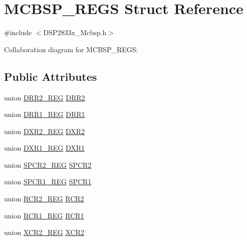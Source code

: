 \hypertarget{struct_m_c_b_s_p___r_e_g_s}{}\section{M\+C\+B\+S\+P\+\_\+\+R\+E\+G\+S Struct Reference}
\label{struct_m_c_b_s_p___r_e_g_s}


{\ttfamily \#include $<$D\+S\+P2833x\+\_\+\+Mcbsp.\+h$>$}



Collaboration diagram for M\+C\+B\+S\+P\+\_\+\+R\+E\+G\+S\+:
\subsection*{Public Attributes}
\begin{DoxyCompactItemize}
\item 
union \hyperlink{union_d_r_r2___r_e_g}{D\+R\+R2\+\_\+\+R\+E\+G} \hyperlink{struct_m_c_b_s_p___r_e_g_s_afce955ad6978e7a13dad4b00baa2021b}{D\+R\+R2}
\item 
union \hyperlink{union_d_r_r1___r_e_g}{D\+R\+R1\+\_\+\+R\+E\+G} \hyperlink{struct_m_c_b_s_p___r_e_g_s_a8525c0c84cbbbc4d21ba664ac35914e4}{D\+R\+R1}
\item 
union \hyperlink{union_d_x_r2___r_e_g}{D\+X\+R2\+\_\+\+R\+E\+G} \hyperlink{struct_m_c_b_s_p___r_e_g_s_a1c316e46d72eaa6dc758b4d65ff84f8c}{D\+X\+R2}
\item 
union \hyperlink{union_d_x_r1___r_e_g}{D\+X\+R1\+\_\+\+R\+E\+G} \hyperlink{struct_m_c_b_s_p___r_e_g_s_ada0072b2ab619562d004fea1976e153e}{D\+X\+R1}
\item 
union \hyperlink{union_s_p_c_r2___r_e_g}{S\+P\+C\+R2\+\_\+\+R\+E\+G} \hyperlink{struct_m_c_b_s_p___r_e_g_s_a0458ca0aab06debfdb25e63ca91570da}{S\+P\+C\+R2}
\item 
union \hyperlink{union_s_p_c_r1___r_e_g}{S\+P\+C\+R1\+\_\+\+R\+E\+G} \hyperlink{struct_m_c_b_s_p___r_e_g_s_ad5fae1b193662bf6451390d6ad7b4243}{S\+P\+C\+R1}
\item 
union \hyperlink{union_r_c_r2___r_e_g}{R\+C\+R2\+\_\+\+R\+E\+G} \hyperlink{struct_m_c_b_s_p___r_e_g_s_a11a5dee76c016c2092f8778ae42a1e99}{R\+C\+R2}
\item 
union \hyperlink{union_r_c_r1___r_e_g}{R\+C\+R1\+\_\+\+R\+E\+G} \hyperlink{struct_m_c_b_s_p___r_e_g_s_a6116b7250033605cfbe9e15a562c9b71}{R\+C\+R1}
\item 
union \hyperlink{union_x_c_r2___r_e_g}{X\+C\+R2\+\_\+\+R\+E\+G} \hyperlink{struct_m_c_b_s_p___r_e_g_s_a26e6ced244b0f00720e7a6de73446fad}{X\+C\+R2}

\end{DoxyCompactItemize}
